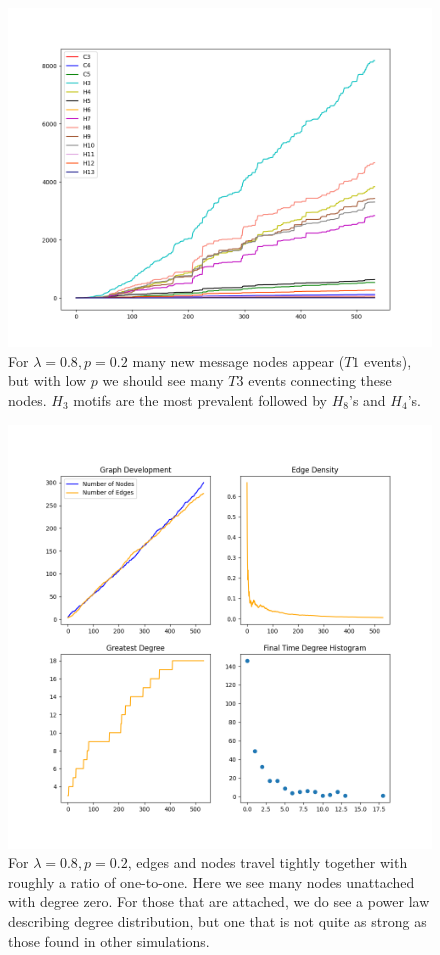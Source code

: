 \begin{figure}[h!]
    \includegraphics[width=15cm]{Images/twitter_sim_for_stats_3_0.8_0.2.png}
    \centering
    \caption{For $\lambda=0.8, p=0.2$ many new message nodes appear ($T1$ events), but
    with low $p$ we should see many $T3$ events connecting these nodes. $H_{3}$ motifs are the most prevalent
    followed by $H_{8}$'s and $H_{4}$'s.}
    \label{fig:thij0802}
\end{figure}

\begin{figure}[h!]
    \includegraphics[width=14cm]{Images/twitter_sim_stats_3_0.8_0.2.png}
    \centering
    \caption{For $\lambda=0.8, p=0.2$, edges and nodes travel tightly together with roughly a ratio of 
     one-to-one. Here we see many nodes unattached with degree zero.
    For those that are attached, we do see a power law describing degree distribution, but one that is not quite
    as strong as those found in other simulations.}
    \label{fig:stats0802}
\end{figure}


